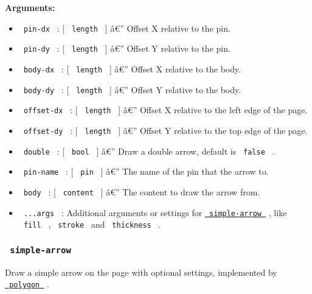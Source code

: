 \textbf{Arguments:}

\begin{itemize}
\tightlist
\item
  \texttt{\ pin-dx\ } : {[} \texttt{\ length\ } {]} â€'' Offset X
  relative to the pin.
\item
  \texttt{\ pin-dy\ } : {[} \texttt{\ length\ } {]} â€'' Offset Y
  relative to the pin.
\item
  \texttt{\ body-dx\ } : {[} \texttt{\ length\ } {]} â€'' Offset X
  relative to the body.
\item
  \texttt{\ body-dy\ } : {[} \texttt{\ length\ } {]} â€'' Offset Y
  relative to the body.
\item
  \texttt{\ offset-dx\ } : {[} \texttt{\ length\ } {]} â€'' Offset X
  relative to the left edge of the page.
\item
  \texttt{\ offset-dy\ } : {[} \texttt{\ length\ } {]} â€'' Offset Y
  relative to the top edge of the page.
\item
  \texttt{\ double\ } : {[} \texttt{\ bool\ } {]} â€'' Draw a double
  arrow, default is \texttt{\ false\ } .
\item
  \texttt{\ pin-name\ } : {[} \texttt{\ pin\ } {]} â€'' The name of the
  pin that the arrow to.
\item
  \texttt{\ body\ } : {[} \texttt{\ content\ } {]} â€'' The content to
  draw the arrow from.
\item
  \texttt{\ ...args\ } : Additional arguments or settings for
  \href{https://github.com/typst/packages/raw/main/packages/preview/pinit/0.2.2/\#simple-arrow}{\texttt{\ simple-arrow\ }}
  , like \texttt{\ fill\ } , \texttt{\ stroke\ } and
  \texttt{\ thickness\ } .
\end{itemize}

\subsubsection{\texorpdfstring{\texttt{\ simple-arrow\ }}{ simple-arrow }}\label{simple-arrow}

Draw a simple arrow on the page with optional settings, implemented by
\href{https://typst.app/docs/reference/visualize/polygon/}{\texttt{\ polygon\ }}
.

\begin{Shaded}
\begin{Highlighting}[]
\end{Highlighting}
\end{Shaded}

